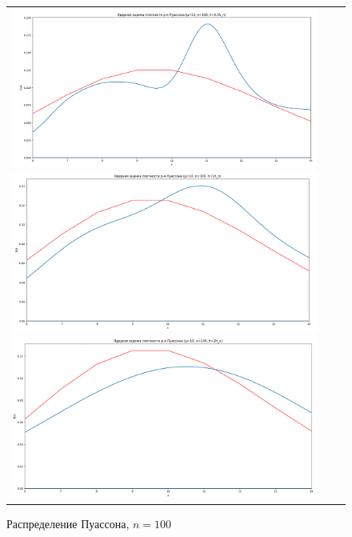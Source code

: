 \begin{figure}[H]
	\begin{tabular}{ccc}
		\includegraphics[scale=0.14]{resources/4_poisson_100_half.png}
		\includegraphics[scale=0.14]{resources/4_poisson_100_one.png}
		\includegraphics[scale=0.14]{resources/4_poisson_100_two.png}
	\end{tabular}
	\caption{Распределение Пуассона, $n=100$}
\end{figure}

